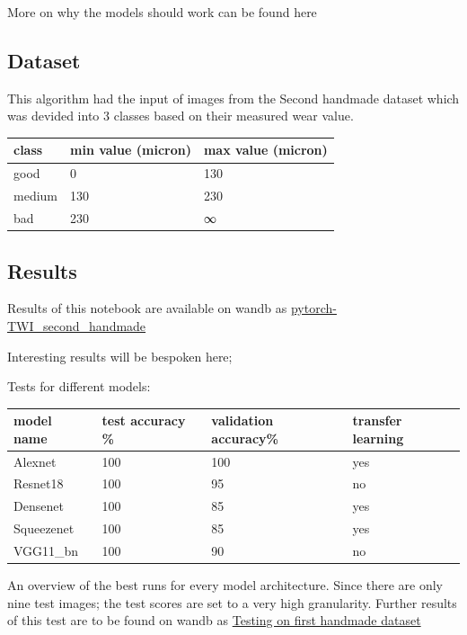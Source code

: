 More on why the models should work can be found here



\subsection{Dataset}



This algorithm had the input of images from the Second handmade dataset which was devided into 3 classes based on their measured wear value. 

\begin{tabular}{ |l|l|l| }
\hline
 class & min value (micron) & max value (micron) \tabularnewline
\hline
\hline
 good & 0 & 130 \tabularnewline
\hline
 medium & 130 & 230 \tabularnewline
\hline
 bad & 230 & ∞ \tabularnewline
\hline
\end{tabular}










\subsection{Results}

Results of this notebook are available on wandb as \href{https://wandb.ai/dplars/pytorch-TWI_second_handmade?workspace=user-dplars}{pytorch-TWI\_second\_handmade}



Interesting results will be bespoken here;

Tests for different models: 

\begin{tabular}{ |l|l|l|l| }
\hline
 model name & test accuracy \% & validation accuracy\% & transfer learning \tabularnewline
\hline
\hline
 Alexnet & 100 & 100 & yes \tabularnewline
\hline
 Resnet18 & 100 & 95 & no \tabularnewline
\hline
 Densenet & 100 & 85 & yes \tabularnewline
\hline
 Squeezenet & 100 & 85 & yes \tabularnewline
\hline
 VGG11\_bn & 100 & 90 & no \tabularnewline
\hline
\end{tabular}
										

An overview of the best runs for every model architecture. Since there are only nine test images; the test scores are set to a very high granularity. Further results of this test are to be found on wandb as \href{https://wandb.ai/dplars/pytorch-TWI_second_handmade/reports/Testing-on-first-handmade-dataset--VmlldzozNTE5NzM}{Testing on first handmade dataset}





